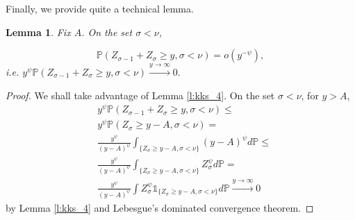 \documentclass[12pt]{article}
\newcommand{\Pro}{\mathbb{P}}
\newcommand{\env}{\mathcal{A}}
\newcommand*\Proo[1]{\Pro \left( #1 \right) }
\newtheorem{lemma}[theorem]{Lemma}
\newcommand{\expect}{\operatorname{\mathbb{E}}\expectarg}
\begin{document}
\bigskip

Finally, we provide quite a technical lemma.
\begin{lemma}\label{l:technical}
Fix $A$. On the set $\sigma < \nu$,

\begin{equation*}
    \Proo{Z_{\sigma-1}+Z_\sigma \geq y, \sigma < \nu}  = o(y^{-\psi}),
\end{equation*} i.e. $y^{\psi} \Proo{Z_{\sigma-1}+Z_\sigma \geq y, \sigma < \nu}  \xrightarrow{y\rightarrow \infty} 0.$
\end{lemma}
\begin{proof}

We shall take advantage of Lemma \ref{l:kks_4}. On the set $\sigma < \nu$, for $y > A$, 
\begin{equation*}
\begin{aligned}
    & y^{\psi} \Proo{Z_{\sigma-1}+Z_\sigma \geq y, \sigma < \nu} \leq \\
    & y^{\psi} \Proo{Z_\sigma \geq y - A, \sigma < \nu} =  \\ 
    & \frac{y^\psi}{(y-A)^\psi} \int_{\{Z_\sigma \geq y - A, \sigma < \nu\}} (y-A)^\psi d \Pro \leq \\ 
    & \frac{y^\psi}{(y-A)^\psi} \int_{\{Z_\sigma \geq y - A,\sigma < \nu\}} Z_\sigma^\psi d \Pro  = \\
    & \frac{y^\psi}{(y-A)^\psi} \int Z_\sigma^\psi \mathds{1}_{\{Z_\sigma \geq y - A, \sigma < \nu\}} d \Pro  \xrightarrow{y\rightarrow \infty} 0
\end{aligned}
\end{equation*}
by Lemma \ref{l:kks_4} and Lebesgue's dominated convergence theorem.

\end{proof}
\end{document}
